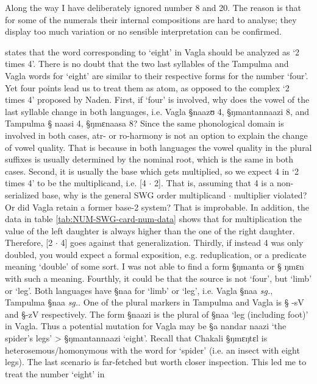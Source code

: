 Along the way I have deliberately ignored number 8  and 20. The
 reason
is that for some of the numerals their internal compositions are hard
to analyse;  they display too much variation or  no sensible interpretation
can be confirmed.  

\citet[166]{Nade89} states that the word
corresponding to `eight' in Vagla  should be analyzed as `2 times 4'.   There is
no doubt that the two last syllables of the Tampulma  and Vagla
words for `eight'  are  similar to their respective forms for the
number `four'. Yet four points lead us to treat them as atom,  as opposed to
the 
complex `2 times 4' proposed by Naden. First,  if `four' is involved, why does
the vowel of the last syllable change in
both languages, i.e. Vagla  {\S naazʊ}  4,  {\S ŋmantannaazi}  8,  and 
Tampulma {\S
naasi}  4, {\S ŋmɛnaasa}  8?  Since the
same phonological domain is involved in both cases, {\sc atr}- or {\sc
ro}-harmony is not an
option to explain the change of vowel quality. That is because in both languages
the vowel quality
in the plural suffixes is usually determined by the nominal root, which is the
same in
both
cases.   Second, it is  usually the base which gets multiplied, so we expect 4
in  `2
times 4'   to be the multiplicand, i.e. [4 $\cdot$ 2]. That is, assuming that 4
is a non-serialized
base, why is the general SWG order {\sc multiplicand} $\cdot$ {\sc
multiplier} violated? Or
did Vagla retain a former base-2 system?  That is improbable.  In addition, 
 the data in table \ref{tab:NUM-SWG-card-num-data} shows that for
multiplication the
value of the left
daughter is always higher than the one of the right daughter. Therefore,  [2
$\cdot$ 4]  goes
against that generalization. Thirdly, if instead  4 was only doubled, you 
would expect a formal exposition, e.g.  reduplication, or a predicate meaning
`double' of some sort. I was not able to find a form {\S ŋmanta}  or  {\S
ŋmɛn} with such a meaning. Fourthly, it could be that the source is not `four',
but `limb' or `leg'. Both
languages have {\S naa} for `limb' or `leg', i.e. Vagla {\S naa} {\it sg.}, 
Tampulma 
{\S naa} {\it sg.}.  One of the plural markers in Tampulma and  Vagla is  {\S
-sV}
and   {\S -zV} respectively.  The form {\S naazi} is the plural  of {\S naa}
`leg (including foot)' in Vagla.  Thus a
potential mutation for Vagla may be  {\S a nandar naazi} `the spider's legs' >
{\S ŋmantannaazi} `eight'. Recall that  Chakali {\S ŋmɛŋtɛl} is
heterosemous/homonymous with the word for `spider' (i.e. an insect with eight
legs).  The last scenario is far-fetched but worth 
closer inspection. This led me to treat  the number  `eight' in
